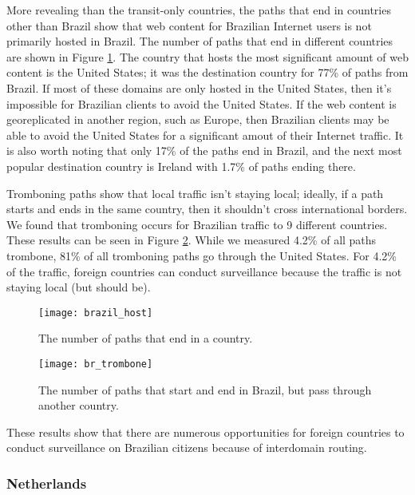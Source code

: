 More revealing than the transit-only countries, the paths that end in countries other than Brazil show that web content for Brazilian Internet users is not primarily hosted in Brazil.  The number of paths that end in different countries are shown in Figure \ref{fig:host}.  The country that hosts the most significant amount of web content is the United States; it was the destination country for 77\% of paths from Brazil.  If most of these domains are only hosted in the United States, then it's impossible for Brazilian clients to avoid the United States.  If the web content is georeplicated in another region, such as Europe, then Brazilian clients may be able to avoid the United States for a significant amout of their Internet traffic.  It is also worth noting that only 17\% of the paths end in Brazil, and the next most popular destination country is Ireland with 1.7\% of paths ending there.  

Tromboning paths show that local traffic isn't staying local; ideally, if a path starts and ends in the same country, then it shouldn't cross international borders.  We found that tromboning occurs for Brazilian traffic to 9 different countries.  These results can be seen in Figure \ref{fig:trombone}.  While we measured 4.2\% of all paths trombone, 81\% of all tromboning paths go through the United States.  For 4.2\% of the traffic, foreign countries can conduct surveillance because the traffic is not staying local (but should be). 

\begin{figure}[t!]
\centering
\texttt{[image: brazil\_host]}
\caption{The number of paths that end in a country.}
\label{fig:host}
\end{figure} 

\begin{figure}
\centering
\texttt{[image: br\_trombone]}
\caption{The number of paths that start and end in Brazil, but pass through another country.}
\label{fig:trombone}
\end{figure}

These results show that there are numerous opportunities for foreign countries to conduct surveillance on Brazilian citizens because of interdomain routing. 

\subsubsection{Netherlands}

